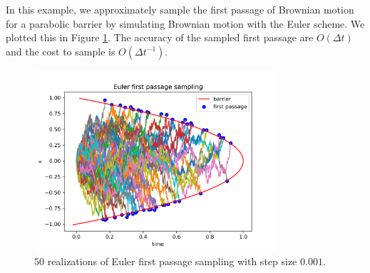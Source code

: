 \documentclass[a4paper,12pt]{article}
\begin{document}
\begin{example} \label{ex:euler first passage sampling}
  In this example, we approximately sample the first passage of Brownian motion
  for a parabolic barrier by simulating Brownian motion with the Euler scheme. We plotted
  this in Figure \ref{fig:Euler first passage para}. The accuracy of the sampled first passage
  are $O(\Delta t)$ and the cost to sample is $O(\Delta t ^{-1})$.

  \begin{figure}[h!]
    \centering
    \includegraphics[width=0.8\textwidth]{plots/Euler first passage para.png}
    \caption{ $50$ realizations of Euler first passage sampling with step size $0.001$.}
    \label{fig:Euler first passage para}
  \end{figure}
\end{example}
\end{document}
